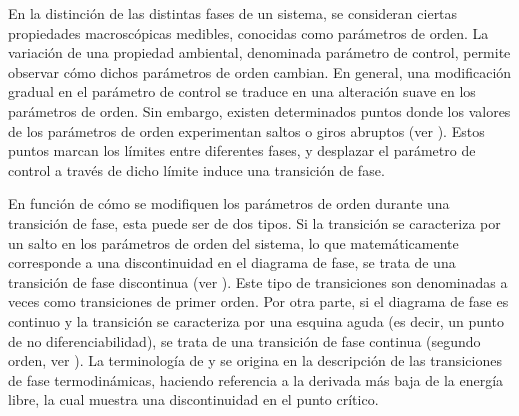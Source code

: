 En la distinción de las distintas fases de un sistema, se consideran ciertas propiedades macroscópicas medibles, conocidas como parámetros de orden. La variación de una propiedad ambiental, denominada parámetro de control, permite observar cómo dichos parámetros de orden cambian. En general, una modificación gradual en el parámetro de control se traduce en una alteración suave en los parámetros de orden. Sin embargo, existen determinados puntos donde los valores de los parámetros de orden experimentan saltos o giros abruptos (ver ). Estos puntos marcan los límites entre diferentes fases, y desplazar el parámetro de control a través de dicho límite induce una transición de fase.

En función de cómo se modifiquen los parámetros de orden durante una transición de fase, esta puede ser de dos tipos. Si la transición se caracteriza por un salto en los parámetros de orden del sistema, lo que matemáticamente corresponde a una discontinuidad en el diagrama de fase, se trata de una transición de fase discontinua (ver  ). Este tipo de transiciones son denominadas a veces como transiciones de primer orden. Por otra parte, si el diagrama de fase es continuo y la transición se caracteriza por una esquina aguda (es decir, un punto de no diferenciabilidad), se trata de una transición de fase continua (segundo orden, ver ). La terminología de  y  se origina en la descripción de las transiciones de fase termodinámicas, haciendo referencia a la derivada más baja de la energía libre, la cual muestra una discontinuidad en el punto crítico.


